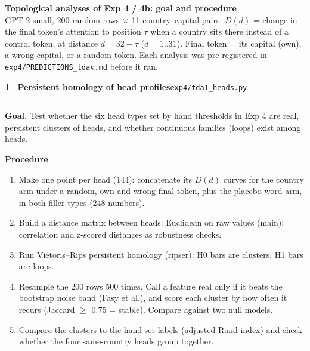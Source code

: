 \documentclass[10pt]{article}
\newcommand{\analysis}[3]{%
  \vspace{5pt}
  {\large\bfseries #1}\hfill{\color{muted}\footnotesize #2}\\[-3pt]\rule{\linewidth}{0.5pt}\par
  \colorbox{plane}{\parbox{\dimexpr\linewidth-2\fboxsep}{\small\textbf{Goal.} #3}}\par\vspace{1pt}
  {\small\textbf{Procedure}}\par\small}
\begin{document}
{\LARGE\bfseries Topological analyses of Exp 4 / 4b: goal and procedure}\\[3pt]
{\small\color{ink2} GPT-2 small, 200 random rows $\times$ 11 country--capital pairs. $D(d)$ = change in the final
token's attention to position $\tau$ when a country sits there instead of a control token, at distance $d = 32-\tau$
($d = 1..31$). Final token = its capital (own), a wrong capital, or a random token. Each analysis was pre-registered
in \texttt{exp4/PREDICTIONS\_tda$k$.md} before it ran.}

\analysis{1 \textperiodcentered\ Persistent homology of head profiles}{\texttt{exp4/tda1\_heads.py}}
{Test whether the six head types set by hand thresholds in Exp 4 are real, persistent clusters of heads, and whether
continuous families (loops) exist among heads.}
\begin{enumerate}
\item Make one point per head (144): concatenate its $D(d)$ curves for the country arm under a random, own and wrong
  final token, plus the placebo-word arm, in both filler types (248 numbers).
\item Build a distance matrix between heads: Euclidean on raw values (main); correlation and z-scored distances as
  robustness checks.
\item Run Vietoris--Rips persistent homology (ripser): H0 bars are clusters, H1 bars are loops.
\item Resample the 200 rows 500 times. Call a feature real only if it beats the bootstrap noise band (Fasy et al.), and
  score each cluster by how often it recurs (Jaccard $\ge$ 0.75 = stable). Compare against two null models.
\item Compare the clusters to the hand-set labels (adjusted Rand index) and check whether the four same-country
  heads group together.
\end{enumerate}
\end{document}
